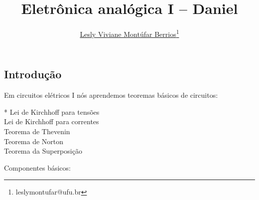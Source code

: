 \documentclass{PETeletrica}
\title{Eletrônica analógica I -- Daniel}
\author[1]{\underline{Lesly Viviane Montúfar Berrios}\thanks{leslymontufar@ufu.br}}
\affil[1]{FEELT - Universidade Federal de Uberlândia}
\begin{document}
\inserirtitulo

\begin{multicols}{2}




\section{Introdução}
Em circuitos elétricos I nós aprendemos teoremas básicos de circuitos:

* Lei de Kirchhoff para tensões\\
\indent* Lei de Kirchhoff para correntes\\
\indent* Teorema de Thevenin\\
\indent* Teorema de Norton\\
\indent* Teorema da Superposição

\vspace{0.4cm}
Componentes básicos:

\begin{figure}[H]
\centering


\end{figure}
\end{multicols}
\end{document}
